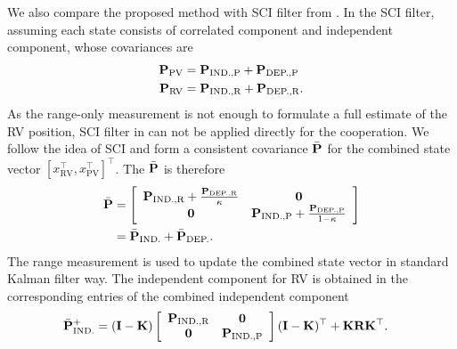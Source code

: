We also compare the proposed method with SCI filter from \cite{Lihao2013A}. In the SCI filter, assuming each state consists of correlated component and independent component, whose covariances are
\begin{equation}
\begin{split}
{\bf P}_\text{PV}&={\bf P}_\text{IND.,P}+{\bf P}_\text{DEP.,P} \\
{\bf P}_\text{RV}&={\bf P}_\text{IND.,R}+{\bf P}_\text{DEP.,R}. \\
\end{split}
\end{equation}
As the range-only measurement is not enough to formulate a full estimate of the RV position, SCI filter in \cite{Lihao2013A} can not be applied directly for the cooperation. We follow the idea of SCI and form a consistent covariance $\bar{\bf P}$ for the combined state vector $[x_\text{RV}^\top,x_\text{PV}^\top]^\top$.
The $\bar{\bf P}$ is therefore
\begin{equation}
\begin{split}
\bar{\bf P}&=\left[
            \begin{array}{cc}
              {\bf P}_\text{IND.,R}+\frac{{\bf P}_\text{DEP.,R}}{\kappa} &  \bf 0 \\
              \bf 0 & {\bf P}_\text{IND.,P}+\frac{{\bf P}_\text{DEP.,P}}{1-\kappa} \\
            \end{array}
          \right] \\
          &=\bar{\bf P}_\text{IND.}+\bar{\bf P}_\text{DEP.}.
          \end{split}
\end{equation}
The range measurement is used to update the combined state vector in standard Kalman filter way. The independent component for RV is obtained in the corresponding entries of the combined independent component
\begin{equation}
\begin{split}
\bar{\bf P}^+_{\text{IND.}}&=({\bf I}-{\bf K})\left[
            \begin{array}{cc}
              {\bf P}_\text{IND.,R} &  \bf 0 \\
              \bf 0 & {\bf P}_\text{IND.,P} \\
            \end{array}
          \right]({\bf I}-{\bf K})^\top+{\bf K}{\bf R}{\bf K}^\top.
\end{split}
\end{equation}

